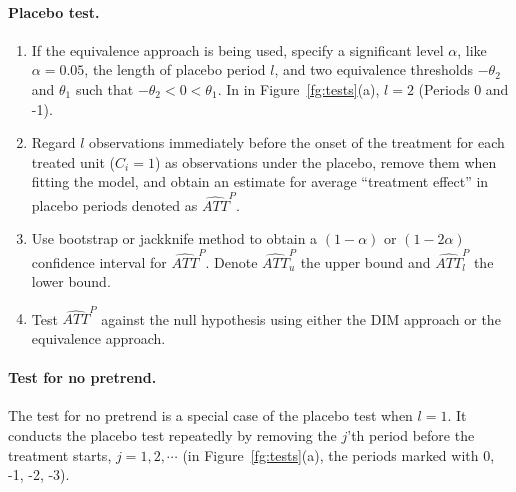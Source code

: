 \documentclass[12pt]{article}
\begin{document}
\paragraph{Placebo test.} 
\begin{enumerate}
    \item If the equivalence approach is being used, specify a significant level $\alpha$, like $\alpha = 0.05$, the length of placebo period $l$, and two equivalence thresholds $-\theta_2$ and $\theta_1$ such that 
    $-\theta_2 < 0 < \theta_1$. In in Figure~\ref{fg:tests}(a), $l = 2$ (Periods 0 and -1).
    
    \item Regard $l$ observations immediately before the onset of the treatment for each treated unit ($C_{i} = 1$) as observations under the placebo, remove them when fitting the model, and obtain an estimate for average ``treatment effect'' in placebo periods denoted as $\widehat{ATT}^P$.
    
    \item Use bootstrap or jackknife method to obtain a 
    $(1 - \alpha)$ or $(1 - 2\alpha)$ confidence interval for $\widehat{ATT}^P$. Denote 
    $\widehat{ATT}^P_u$ the upper bound and 
    $\widehat{ATT}^P_l$ the lower bound.
    
    \item Test $\widehat{ATT}^P$ against the null hypothesis using either the DIM approach or the equivalence approach.  
\end{enumerate}

\paragraph{Test for no pretrend.} The test for no pretrend is a special case of the placebo test when $l = 1$. It conducts the placebo test repeatedly by removing the $j$'th period before the treatment starts, $j = 1, 2, \cdots$ (in Figure~\ref{fg:tests}(a), the periods marked with 0, -1, -2, -3).
\end{document}
